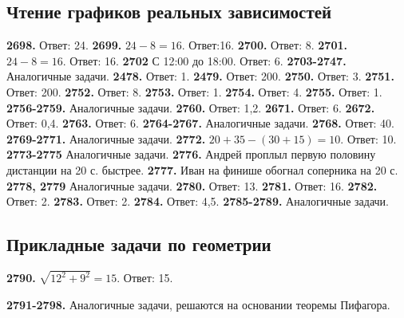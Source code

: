 \subsection{Чтение графиков реальных зависимостей}
\textbf{2698.} Ответ: 24. \textbf{2699.} $24-8=16.$ Ответ:16. \textbf{2700.} Ответ: 8.\newline
\textbf{2701.} $24-8=16.$ Ответ: 16. \textbf{2702} С 12:00 до 18:00. Ответ: 6.\newline
\textbf{2703-2747.} Аналогичные задачи.
\textbf{2478.} Ответ: 1.\newline
\textbf{2479.} Ответ: 200. \textbf{2750.} Ответ: 3. \textbf{2751.} Ответ: 200.\newline
\textbf{2752.} Ответ: 8. \textbf{2753.} Ответ: 1. \textbf{2754.} Ответ: 4. \newline 
\textbf{2755.} Ответ: 1.\newline
\textbf{2756-2759.} Аналогичные задачи.\newline
\textbf{2760.} Ответ: 1,2. \textbf{2671.} Ответ: 6. \textbf{2672.} Ответ: 0,4.\newline
\textbf{2763.} Ответ: 6.\newline
\textbf{2764-2767.} Аналогичные задачи.\newline
\textbf{2768.} Ответ: 40.\newline
\textbf{2769-2771.} Аналогичные задачи.\newline
\textbf{2772.} $20 + 35 - (30 + 15) = 10.$ Ответ: 10.\newline
\textbf{2773-2775} Аналогичные задачи.\newline
\textbf{2776.} Андрей проплыл первую половину дистанции на 20 с. быстрее.\newline
\textbf{2777.} Иван на финише обогнал соперника на 20 с.\newline
\textbf{2778, 2779} Аналогичные задачи.
\textbf{2780.} Ответ: 13.\newline
\textbf{2781.} Ответ: 16. \textbf{2782.} Ответ: 2. \textbf{2783.} Ответ: 2. \newline
\textbf{2784.} Ответ: 4,5.\newline
\textbf{2785-2789.} Аналогичные задачи.

\subsection{Прикладные задачи по геометрии}

\textbf{2790.} $\sqrt{12^2 + 9^2} = 15.$ Ответ: 15.

\textbf{2791-2798.} Аналогичные задачи, решаются на основании теоремы Пифагора.

